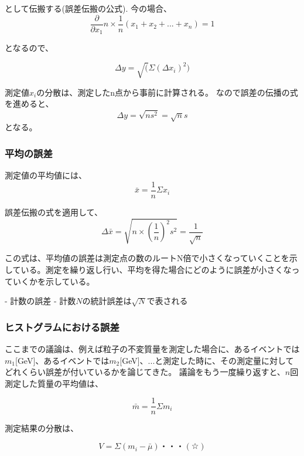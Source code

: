 \documentclass[uplatex]{jsarticle}
\begin{document}
として伝搬する(誤差伝搬の公式).
今の場合、
\begin{equation}
  \frac{\partial}{\partial x_1}n\times \frac{1}{n}(x_1+x_2+...+x_n)=1
\end{equation}

となるので、

\begin{equation}
  \Delta y=\sqrt(\Sigma(\Delta x_i)^2)
\end{equation}

測定値$x_{i}$の分散は、測定したn点から事前に計算される。
なので誤差の伝播の式を進めると、
\begin{equation}
  \Delta y=\sqrt{ns^2}=\sqrt{n}s
\end{equation}
となる。

\subsubsection{平均の誤差}
測定値の平均値には、
\begin{equation}
  \bar{x}=\frac{1}{n}\Sigma x_i
\end{equation}

誤差伝搬の式を適用して、
\begin{equation}
  \Delta \bar{x} = \sqrt{n\times\left(\frac{1}{n}\right)^2s^2}=\frac{1}{\sqrt{n}}
\end{equation}

この式は、平均値の誤差は測定点の数のルートN倍で小さくなっていくことを示している。測定を繰り返し行い、平均を得た場合にどのように誤差が小さくなっていくかを示している。

- 計数の誤差
- 計数$N$の統計誤差は$\sqrt{N}$で表される

\subsubsection{ヒストグラムにおける誤差}
ここまでの議論は、例えば粒子の不変質量を測定した場合に、あるイベントでは$m_1$[GeV]、あるイベントでは$m_2$[GeV]、...と測定した時に、その測定量に対してどれくらい誤差が付いているかを論じてきた。
議論をもう一度繰り返すと、$n$回測定した質量の平均値は、

\begin{equation}
  \bar{m}=\frac{1}{n}\Sigma m_i
\end{equation}

測定結果の分散は、

\begin{equation}
  V=\Sigma(m_i-\bar{\mu})・・・(☆)
\end{equation}
\end{document}
